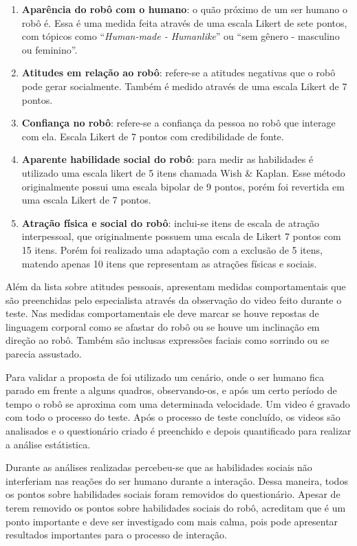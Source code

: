 \begin{enumerate}
	\item \textbf{Aparência do robô com o humano}: o quão próximo de um ser humano o robô é. Essa é uma medida feita através de uma escala Likert de sete pontos, com tópicos como ``\emph{Human-made - Humanlike}'' ou ``sem gênero - masculino ou feminino''.
	\item \textbf{Atitudes em relação ao robô}: refere-se a atitudes negativas que o robô pode gerar socialmente. Também é medido através de uma escala Likert de 7 pontos.
	\item \textbf{Confiança no robô}: refere-se a confiança da pessoa no robô que interage com ela. Escala Likert de 7 pontos com credibilidade de fonte.
	\item \textbf{Aparente habilidade social do robô}: para medir as habilidades é utilizado uma escala likert de 5 itens chamada Wish \& Kaplan. Esse método originalmente possui uma escala bipolar de 9 pontos, porém foi revertida em uma escala Likert de 7 pontos.
	\item \textbf{Atração física e social do robô}: inclui-se itens de escala de atração interpessoal, que originalmente possuem uma escala de Likert 7 pontos com 15 itens. Porém foi realizado uma adaptação com a exclusão de 5 itens, matendo apenas 10 itens que representam as atrações físicas e sociais.
\end{enumerate}

Além da lista sobre atitudes pessoais,  apresentam medidas comportamentais que são preenchidas pelo especialista através da observação do video feito durante o teste. Nas medidas comportamentais ele deve marcar se houve repostas de linguagem corporal como se afastar do robô ou se houve um inclinação em direção ao robô. Também são inclusas expressões faciais como sorrindo ou se parecia assustado.

Para validar a proposta de  foi utilizado um cenário, onde o ser humano fica parado em frente a alguns quadros, observando-os, e após um certo período de tempo o robô se aproxima com uma determinada velocidade. Um video é gravado com todo o processo do teste. Após o processo de teste concluído, os videos são analisados e o questionário criado é preenchido e depois quantificado para realizar a análise estátistica.

Durante as análises realizadas percebeu-se que as habilidades sociais não interferiam nas reações do ser humano durante a interação. Dessa maneira, todos os pontos sobre habilidades sociais foram removidos do questionário. Apesar de terem removido os pontos sobre habilidades sociais do robô,  acreditam que é um ponto importante e deve ser investigado com mais calma, pois pode apresentar resultados importantes para o processo de interação.

